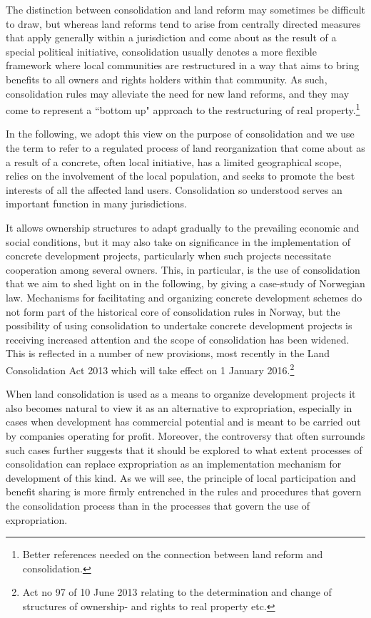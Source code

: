 The distinction between consolidation and land reform may sometimes be difficult to draw, but whereas land reforms tend to arise from centrally directed measures that apply generally within a jurisdiction and come about as the result of a special political initiative, consolidation usually denotes a more flexible framework where local communities are restructured in a way that aims to bring benefits to all owners and rights holders within that community. As such, consolidation rules may alleviate the need for new land reforms, and they may come to represent a ``bottom up" approach to the restructuring of real property.\footnote{Better references needed on the connection between land reform and consolidation.}

In the following, we adopt this view on the purpose of consolidation and we use the term to refer to a regulated process of land reorganization that come about as a result of a concrete, often local initiative, has a limited geographical scope, relies on the involvement of the local population, and seeks to promote the best interests of all the affected land users. Consolidation so understood serves an important function in many jurisdictions. 

It allows ownership structures to adapt gradually to the prevailing economic and social conditions, but it may also take on significance in the implementation of concrete development projects, particularly when such projects necessitate cooperation among several owners. This, in particular, is the use of consolidation that we aim to shed light on in the following, by giving a case-study of Norwegian law. Mechanisms for facilitating and organizing concrete development schemes do not form part of the historical core of consolidation rules in Norway, but the possibility of using consolidation to undertake concrete development projects is receiving increased attention and the scope of consolidation has been widened. This is reflected in a number of new provisions, most recently in the Land Consolidation Act 2013 which will take effect on 1 January 2016.\footnote{Act no 97 of 10 June 2013 relating to the determination and change of structures of ownership- and rights to real property etc.}

When land consolidation is used as a means to organize development projects it also becomes natural to view it as an alternative to expropriation, especially in cases when development has commercial potential and is meant to be carried out by companies operating for profit. Moreover, the controversy that often surrounds such cases further suggests that it should be explored to what extent processes of consolidation can replace expropriation as an implementation mechanism for development of this kind. As we will see, the principle of local participation and benefit sharing is more firmly entrenched in the rules and procedures that govern the consolidation process than in the processes that govern the use of expropriation. 

